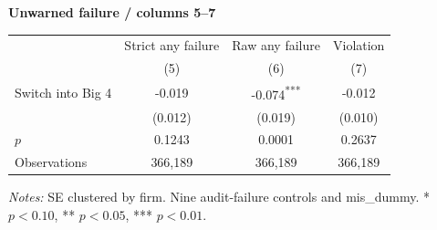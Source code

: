 \documentclass[10pt]{article}
\newcommand{\sym}[1]{\textsuperscript{#1}}
\begin{document}
\medskip\textbf{Unwarned failure / columns 5--7}\par\smallskip
\begin{tabular*}{\textwidth}{@{\extracolsep{\fill}}lccc@{}}
\toprule
 & Strict any failure & Raw any failure & Violation \\
 & (5) & (6) & (7) \\
\midrule
Switch into Big 4 & -0.019 & -0.074\sym{***} & -0.012 \\
 & (0.012) & (0.019) & (0.010) \\
$p$ & 0.1243 & 0.0001 & 0.2637 \\
Observations & 366,189 & 366,189 & 366,189 \\
\bottomrule\end{tabular*}\par
\medskip\fontsize{9}{11}\selectfont\textit{Notes:} SE clustered by firm. Nine audit-failure controls and mis\_dummy. * $p<0.10$, ** $p<0.05$, *** $p<0.01$.
\end{document}
